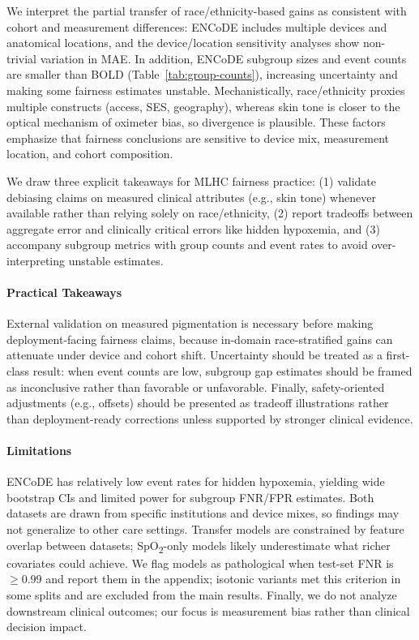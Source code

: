 \documentclass[pmlr]{jmlr}%
\begin{document}
We interpret the partial transfer of race/ethnicity-based gains as consistent with cohort and measurement differences: ENCoDE includes multiple devices and anatomical locations, and the device/location sensitivity analyses show non-trivial variation in MAE. In addition, ENCoDE subgroup sizes and event counts are smaller than BOLD (Table~\ref{tab:group-counts}), increasing uncertainty and making some fairness estimates unstable. Mechanistically, race/ethnicity proxies multiple constructs (access, SES, geography), whereas skin tone is closer to the optical mechanism of oximeter bias, so divergence is plausible. These factors emphasize that fairness conclusions are sensitive to device mix, measurement location, and cohort composition.

We draw three explicit takeaways for MLHC fairness practice: (1) validate debiasing claims on measured clinical attributes (e.g., skin tone) whenever available rather than relying solely on race/ethnicity, (2) report tradeoffs between aggregate error and clinically critical errors like hidden hypoxemia, and (3) accompany subgroup metrics with group counts and event rates to avoid over-interpreting unstable estimates.

\paragraph{Practical Takeaways}
External validation on measured pigmentation is necessary before making deployment-facing fairness claims, because in-domain race-stratified gains can attenuate under device and cohort shift. Uncertainty should be treated as a first-class result: when event counts are low, subgroup gap estimates should be framed as inconclusive rather than favorable or unfavorable. Finally, safety-oriented adjustments (e.g., offsets) should be presented as tradeoff illustrations rather than deployment-ready corrections unless supported by stronger clinical evidence.

\paragraph{Limitations}
ENCoDE has relatively low event rates for hidden hypoxemia, yielding wide bootstrap CIs and limited power for subgroup FNR/FPR estimates. Both datasets are drawn from specific institutions and device mixes, so findings may not generalize to other care settings. Transfer models are constrained by feature overlap between datasets; SpO\textsubscript{2}-only models likely underestimate what richer covariates could achieve. We flag models as pathological when test-set FNR is $\geq 0.99$ and report them in the appendix; isotonic variants met this criterion in some splits and are excluded from the main results. Finally, we do not analyze downstream clinical outcomes; our focus is measurement bias rather than clinical decision impact.
\end{document}
